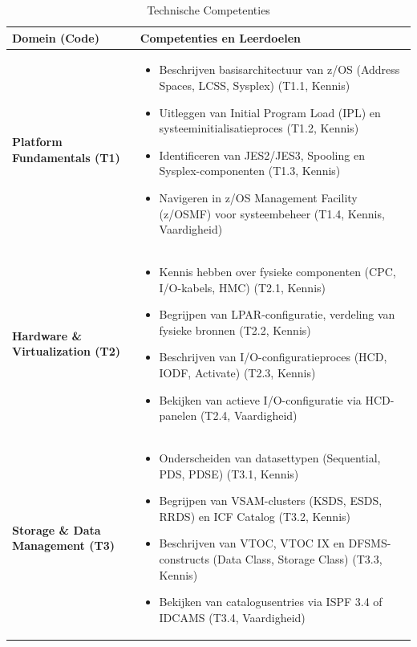 \begin{table}[H]
	\centering
	\renewcommand{\arraystretch}{1.3}
	\begin{tabularx}{\textwidth}{|>{\bfseries\arraybackslash}p{3.5cm}|X|}
		\hline
		\textbf{Domein (Code)} & \textbf{Competenties en Leerdoelen} \\
		\hline
		Platform Fundamentals (T1) &
		\begin{itemize}
			\item Beschrijven basisarchitectuur van z/OS (Address Spaces, LCSS, Sysplex) (T1.1, Kennis)
			\item Uitleggen van Initial Program Load (IPL) en systeeminitialisatieproces (T1.2, Kennis)
			\item Identificeren van JES2/JES3, Spooling en Sysplex-componenten (T1.3, Kennis)
			\item Navigeren in z/OS Management Facility (z/OSMF) voor systeembeheer (T1.4, Kennis, Vaardigheid)
		\end{itemize} \\
		\hline
		Hardware \& Virtualization (T2) &
		\begin{itemize}
			\item Kennis hebben over fysieke componenten (CPC, I/O-kabels, HMC) (T2.1, Kennis)
			\item Begrijpen van LPAR-configuratie, verdeling van fysieke bronnen (T2.2, Kennis)
			\item Beschrijven van I/O-configuratieproces (HCD, IODF, Activate) (T2.3, Kennis)
			\item Bekijken van actieve I/O-configuratie via HCD-panelen (T2.4, Vaardigheid)
		\end{itemize} \\
		\hline
		Storage \& Data Management (T3) &
		\begin{itemize}
			\item Onderscheiden van datasettypen (Sequential, PDS, PDSE) (T3.1, Kennis)
			\item Begrijpen van VSAM-clusters (KSDS, ESDS, RRDS) en ICF Catalog (T3.2, Kennis)
			\item Beschrijven van VTOC, VTOC IX en DFSMS-constructs (Data Class, Storage Class) (T3.3, Kennis)
			\item Bekijken van catalogusentries via ISPF 3.4 of IDCAMS (T3.4, Vaardigheid)
		\end{itemize} \\
		\hline
\end{tabularx}
\caption{Technische Competenties}
\label{tab:tech-competenties}
\end{table}

